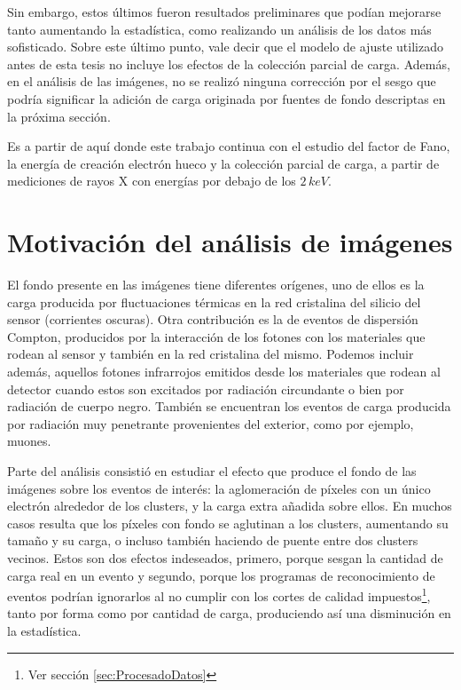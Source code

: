 Sin embargo, estos últimos fueron resultados preliminares que podían mejorarse tanto aumentando la estadística, como realizando un análisis de los datos más sofisticado. Sobre este último punto, vale decir que el modelo de ajuste utilizado antes de esta tesis no incluye los efectos de la colección parcial de carga. Además, en el análisis de las imágenes, no se realizó ninguna corrección por el sesgo que podría significar la adición de carga originada por fuentes de fondo descriptas en la próxima sección.

Es a partir de aquí donde este trabajo continua con el estudio del factor de Fano, la energía de creación electrón hueco y la colección parcial de carga, a partir de mediciones de rayos X con energías por debajo de los $2\,\si{keV}$.

\section{Motivación del análisis de imágenes}
\noindent El fondo presente en las imágenes tiene diferentes orígenes, uno de ellos es la carga producida por fluctuaciones térmicas en la red cristalina del silicio del sensor (corrientes oscuras). Otra contribución es la de eventos de dispersión Compton, producidos por la interacción de los fotones con los materiales que rodean al sensor y también en la red cristalina del mismo. Podemos incluir además, aquellos fotones infrarrojos emitidos desde los materiales que rodean al detector cuando estos son excitados por radiación circundante o bien por radiación de cuerpo negro. También se encuentran los eventos de carga producida por radiación muy penetrante provenientes del exterior, como por ejemplo, muones.

Parte del análisis consistió en estudiar el efecto que produce el fondo de las imágenes sobre los eventos de interés: la aglomeración de píxeles con un único electrón alrededor de los clusters, y la carga extra añadida sobre ellos. 
En muchos casos resulta que los píxeles con fondo se aglutinan a los clusters, aumentando su tamaño y su carga, o incluso también haciendo de puente entre dos clusters vecinos. Estos son dos efectos indeseados, primero, porque sesgan la cantidad de carga real en un evento y segundo, porque los programas de reconocimiento de eventos podrían ignorarlos al no cumplir con los cortes de calidad impuestos\footnote{Ver sección \ref{sec:ProcesadoDatos}}, tanto por forma como por cantidad de carga, produciendo así una disminución en la estadística.

